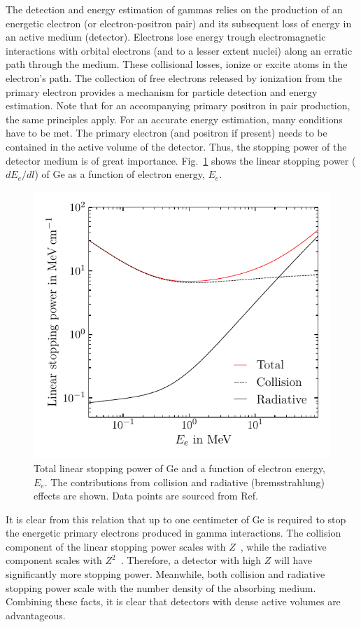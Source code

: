 The detection and energy estimation of gammas relies on the production of an energetic electron (or electron-positron pair) and its subsequent loss of energy in an active medium (detector). Electrons lose energy trough electromagnetic interactions with orbital electrons (and to a lesser extent nuclei) along an erratic path through the medium. These collisional losses, ionize or excite atoms in the electron's path. The collection of free electrons released by ionization from the primary electron provides a mechanism for particle detection and energy estimation. Note that for an accompanying primary positron in pair production, the same principles apply. For an accurate energy estimation, many conditions have to be met. The primary electron (and positron if present) needs to be contained in the active volume of the detector. Thus, the stopping power of the detector medium is of great importance. Fig.~\ref{fig:stopping} shows the linear stopping power ($dE_e/dl$) of Ge as a function of electron energy, $E_e$. 
\begin{figure}[htb]
	\centering
	\includegraphics{figs/gammas/linear_stopping_ge_width_4in.pdf}
	\caption{Total linear stopping power of Ge and a function of electron energy, $E_e$. The contributions from collision and radiative (bremsstrahlung) effects are shown. Data points are sourced from Ref.~\cite{NIST_e}}
	\label{fig:stopping}
\end{figure}

It is clear from this relation that up to one centimeter of Ge is required to stop the energetic primary electrons produced in gamma interactions. The collision component of the linear stopping power scales with $Z$~\cite{bethe}, while the radiative component scales with $Z^2$~\cite{bremsstrahlung}. Therefore, a detector with high $Z$ will have significantly more stopping power. Meanwhile, both collision and radiative stopping power scale with the number density of the absorbing medium. Combining these facts, it is clear that detectors with dense active volumes are advantageous.  

